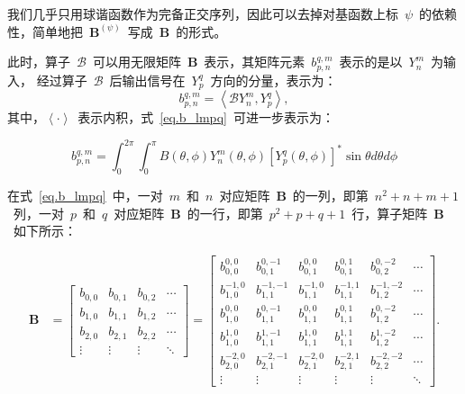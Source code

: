 我们几乎只用球谐函数作为完备正交序列，因此可以去掉对基函数上标~$\psi$~的依赖性，简单地把~$\mathbf{B}^{(\psi)}$~写成~$\mathbf{B}$~的形式。

此时，算子~$\mathcal{B}$~可以用无限矩阵~$\mathbf{B}$~表示，其矩阵元素~$b_{p,n}^{q,m}$~表示的是以~$Y_{n}^{m}$~为输入，
经过算子~$\mathcal{B}$~后输出信号在~$Y_{p}^{q}$~方向的分量，表示为：
\begin{equation}\label{eq.b_lmpq}
b_{p,n}^{q,m} = \left< \mathcal{B}Y_{n}^{m},Y_{p}^{q} \right>,
\end{equation}
其中，$\left< \cdot \right>$~表示内积，式~\eqref{eq.b_lmpq}~可进一步表示为：

\begin{equation}
b_{p,n}^{q,m} = \int_{0}^{2\pi}\int _{0}^{\pi} B(\theta,\phi)Y_{n}^{m}(\theta,\phi) \left[Y_{p}^{q}(\theta,\phi) \right]^{*}\sin\theta d\theta d\phi
\end{equation}

在式~\eqref{eq.b_lmpq}~中，一对~$m$~和~$n$~对应矩阵~$\mathbf{B}$~的一列，即第~$n^2+n+m+1$~列，一对~$p$~和~$q$~对应矩阵~$\mathbf{B}$~的一行，即第~$p^2+p+q+1$~行，算子矩阵~$\mathbf{B}$~如下所示：

\begin{align}
\mathbf{B} & =\left[
\begin{array}{cccc}
b_{0,0} & b_{0,1} & b_{0,2} & \cdots  \\
b_{1,0} & b_{1,1} & b_{1,2} & \cdots  \\
b_{2,0} & b_{2,1} & b_{2,2} & \cdots   \\
\vdots & \vdots &  \vdots  & \ddots
\end{array}\right]
= \left[
\begin{array}{c|ccc|cc}
b_{0,0}^{0,0} & b_{0,1}^{0,-1} & b_{0,1}^{0,0} & b_{0,1}^{0,1} & b_{0,2}^{0,-2} & \cdots  \\
\hline
b_{1,0}^{-1,0} & b_{1,1}^{-1,-1} & b_{1,1}^{-1,0} & b_{1,1}^{-1,1} & b_{1,2}^{-1,-2} & \cdots  \\
b_{1,0}^{0,0} & b_{1,1}^{0,-1} & b_{1,1}^{0,0} & b_{1,1}^{0,1} & b_{1,2}^{0,-2} & \cdots  \\
b_{1,0}^{1,0} & b_{1,1}^{1,-1} & b_{1,1}^{1,0} & b_{1,1}^{1,1} & b_{1,2}^{1,-2} & \cdots  \\
\hline
b_{2,0}^{-2,0} & b_{2,1}^{-2,-1} & b_{2,1}^{-2,0} & b_{2,1}^{-2,1} & b_{2,2}^{-2,-2} & \cdots  \\
\vdots & \vdots &  \vdots  & \vdots &  \vdots & \ddots
\end{array}\right].
\end{align}

